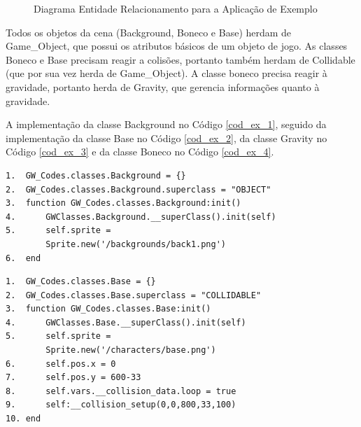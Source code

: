 \documentclass[
	12pt,				%
	openright,			%
	oneside,			%
	a4paper,			%
	brazil,				%
	]{abntex2}
\begin{document}
\begin{figure}
\centering
{}
\caption{Diagrama Entidade Relacionamento para a Aplicação de Exemplo}
\label{fig:derExemplo}
\end{figure}

Todos os objetos da cena (Background, Boneco e Base) herdam de Game\_Object, que possui os atributos básicos de um objeto de jogo. As classes Boneco e Base precisam reagir a colisões, portanto também herdam de Collidable (que por sua vez herda de Game\_Object). A classe boneco precisa reagir à gravidade, portanto herda de Gravity, que gerencia informações quanto à gravidade.

A implementação da classe Background no Código \ref{cod_ex_1}, seguido da implementação da classe Base no Código \ref{cod_ex_2}, da classe Gravity no Código \ref{cod_ex_3} e da classe Boneco no Código \ref{cod_ex_4}.

\begin{lstlisting}[caption={Classe Background},label=cod_ex_1,frame=single]
1.	GW_Codes.classes.Background = {}
2.	GW_Codes.classes.Background.superclass = "OBJECT"
3.	function GW_Codes.classes.Background:init()
4.		GWClasses.Background.__superClass().init(self)
5.		self.sprite = 
		Sprite.new('/backgrounds/back1.png')
6.	end
\end{lstlisting}

\begin{lstlisting}[caption={Classe Base},label=cod_ex_2,frame=single]
1.	GW_Codes.classes.Base = {}
2.	GW_Codes.classes.Base.superclass = "COLLIDABLE"
3.	function GW_Codes.classes.Base:init()
4.		GWClasses.Base.__superClass().init(self)
5.		self.sprite = 
		Sprite.new('/characters/base.png')
6.		self.pos.x = 0
7.		self.pos.y = 600-33
8.		self.vars.__collision_data.loop = true
9.		self:__collision_setup(0,0,800,33,100)
10.	end
\end{lstlisting}
\end{document}

